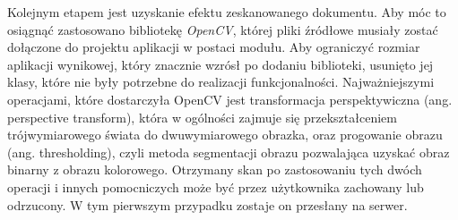 \documentclass[10pt,twoside,a4paper]{report}
\begin{document}
\par Kolejnym etapem jest uzyskanie efektu zeskanowanego dokumentu. Aby móc to osiągnąć zastosowano bibliotekę \textit{OpenCV}\cite{OpenCV}, której pliki źródłowe musiały zostać dołączone do projektu aplikacji w postaci modułu. Aby ograniczyć rozmiar aplikacji wynikowej, który znacznie wzrósł po dodaniu biblioteki, usunięto jej klasy, które nie były potrzebne do realizacji funkcjonalności. Najważniejszymi operacjami, które dostarczyła OpenCV jest transformacja perspektywiczna (ang. perspective transform), która w ogólności zajmuje się przekształceniem trójwymiarowego świata do dwuwymiarowego obrazka, oraz progowanie obrazu (ang. thresholding), czyli metoda segmentacji obrazu pozwalająca uzyskać obraz binarny z obrazu kolorowego. Otrzymany skan po zastosowaniu tych dwóch operacji i innych pomocniczych może być przez użytkownika zachowany lub odrzucony. W tym pierwszym przypadku zostaje on przesłany na serwer.
\end{document}
